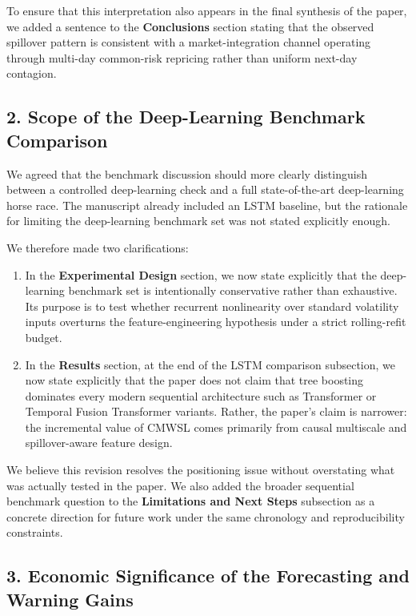 \documentclass[11pt,a4paper]{article}
\begin{document}
To ensure that this interpretation also appears in the final synthesis of the paper, we added a sentence to the \textbf{Conclusions} section stating that the observed spillover pattern is consistent with a market-integration channel operating through multi-day common-risk repricing rather than uniform next-day contagion.

\subsection*{2. Scope of the Deep-Learning Benchmark Comparison}

We agreed that the benchmark discussion should more clearly distinguish between a controlled deep-learning check and a full state-of-the-art deep-learning horse race. The manuscript already included an LSTM baseline, but the rationale for limiting the deep-learning benchmark set was not stated explicitly enough.

We therefore made two clarifications:
\begin{enumerate}[leftmargin=1.6em]
\item In the \textbf{Experimental Design} section, we now state explicitly that the deep-learning benchmark set is intentionally conservative rather than exhaustive. Its purpose is to test whether recurrent nonlinearity over standard volatility inputs overturns the feature-engineering hypothesis under a strict rolling-refit budget.
\item In the \textbf{Results} section, at the end of the LSTM comparison subsection, we now state explicitly that the paper does not claim that tree boosting dominates every modern sequential architecture such as Transformer or Temporal Fusion Transformer variants. Rather, the paper's claim is narrower: the incremental value of CMWSL comes primarily from causal multiscale and spillover-aware feature design.
\end{enumerate}

We believe this revision resolves the positioning issue without overstating what was actually tested in the paper. We also added the broader sequential benchmark question to the \textbf{Limitations and Next Steps} subsection as a concrete direction for future work under the same chronology and reproducibility constraints.

\subsection*{3. Economic Significance of the Forecasting and Warning Gains}
\end{document}
